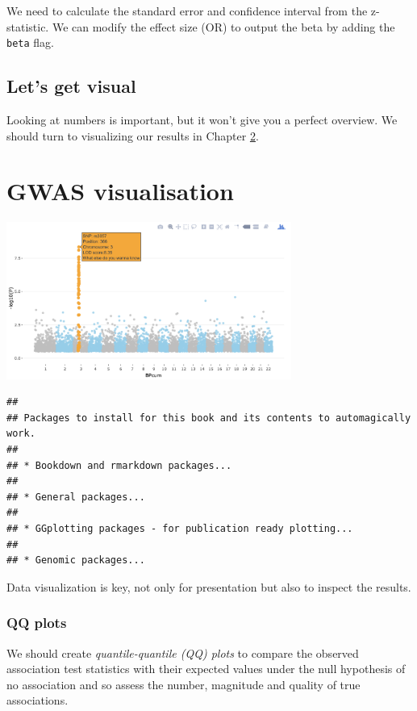 \documentclass[
]{book}
\newcommand{\passthrough}[1]{#1}
\begin{document}
We need to calculate the standard error and confidence interval from the z-statistic. We can modify the effect size (OR) to output the beta by adding the \passthrough{\lstinline!beta!} flag.

\hypertarget{lets-get-visual}{%
\section{Let's get visual}\label{lets-get-visual}}

Looking at numbers is important, but it won't give you a perfect overview. We should turn to visualizing our results in Chapter \ref{gwas-visuals}.

\hypertarget{gwas-visuals}{%
\chapter{GWAS visualisation}\label{gwas-visuals}}

\includegraphics[width=0.7\textwidth,height=\textheight]{./img/_gwas/interactive_plot.png}

\begin{lstlisting}
## 
## Packages to install for this book and its contents to automagically work.
## 
## * Bookdown and rmarkdown packages...
## 
## * General packages...
## 
## * GGplotting packages - for publication ready plotting...
## 
## * Genomic packages...
\end{lstlisting}

Data visualization is key, not only for presentation but also to inspect the results.

\hypertarget{qq-plots}{%
\subsection{QQ plots}\label{qq-plots}}

We should create \emph{quantile-quantile (QQ) plots} to compare the observed association test statistics with their expected values under the null hypothesis of no association and so assess the number, magnitude and quality of true associations.
\end{document}
